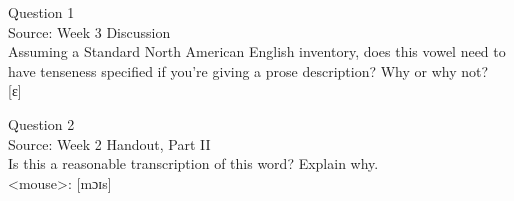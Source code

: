 \documentclass[12pt]{article}
\begin{document}
{\large Question 1}\\

Source: Week 3 Discussion\\

Assuming a Standard North American English inventory, does this vowel need to have tenseness specified if you're giving a prose description? Why or why not?\\

{[ɛ]}


\newpage

{\large Question 2}\\

Source: Week 2 Handout, Part II\\

Is this a reasonable transcription of this word? Explain why.\\

<mouse>: {[mɔɪs]}


\newpage

\begin{center}
\textbf{{\color{red}{\HUGE END OF EXAM}}}\\

\end{center}
\newpage
\end{document}
